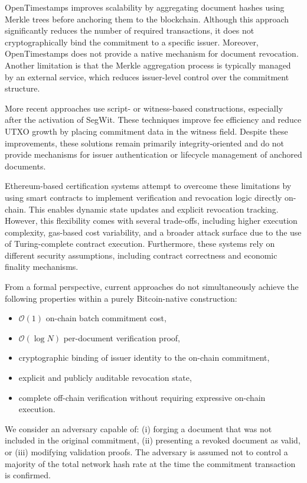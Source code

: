 \documentclass{IEEEoj}
\begin{document}
OpenTimestamps improves scalability by aggregating document hashes using Merkle trees before anchoring them to the blockchain. Although this approach significantly reduces the number of required transactions, it does not cryptographically bind the commitment to a specific issuer. Moreover, OpenTimestamps does not provide a native mechanism for document revocation. 
Another limitation is that the Merkle aggregation process is typically managed by an external service, which reduces issuer-level control over the commitment structure.

More recent approaches use script- or witness-based constructions, especially after the activation of SegWit. These techniques improve fee efficiency and reduce UTXO growth by placing commitment data in the witness field. Despite these improvements, these solutions remain primarily integrity-oriented and do not provide mechanisms for issuer authentication or lifecycle management of anchored documents.

Ethereum-based certification systems attempt to overcome these limitations by using smart contracts to implement verification and revocation logic directly on-chain. This enables dynamic state updates and explicit revocation tracking.  However, this flexibility comes with several trade-offs, including higher execution complexity, gas-based cost variability, and a broader attack surface due to the use of Turing-complete contract execution. Furthermore, these systems rely on different security assumptions, including contract correctness and economic finality mechanisms.

From a formal perspective, current approaches do not simultaneously achieve the following properties within a purely Bitcoin-native construction:

\begin{itemize}
    \item $\mathcal{O}(1)$ on-chain batch commitment cost,
    \item $\mathcal{O}(\log N)$ per-document verification proof,
    \item cryptographic binding of issuer identity to the on-chain commitment,
    \item explicit and publicly auditable revocation state,
    \item complete off-chain verification without requiring expressive on-chain execution.
\end{itemize}

We consider an adversary capable of: 
(i) forging a document that was not included in the original commitment, 
(ii) presenting a revoked document as valid, or 
(iii) modifying validation proofs. 
The adversary is assumed not to control a majority of the total network hash rate at the time the commitment transaction is confirmed.
\end{document}
